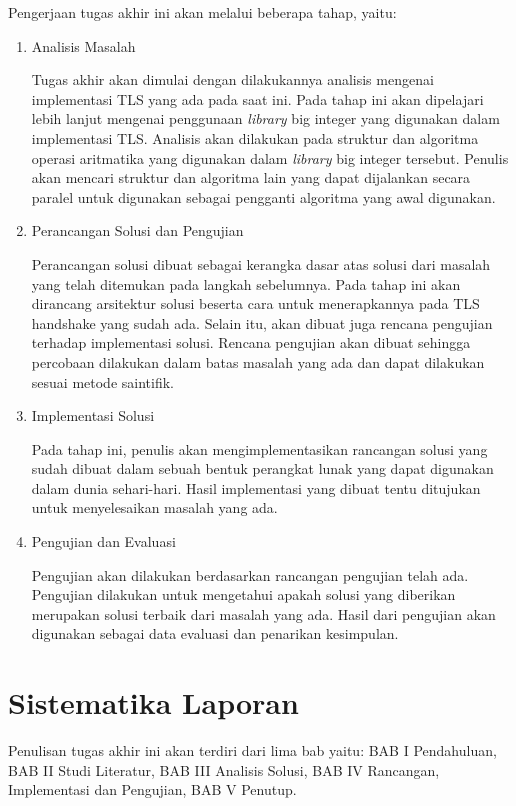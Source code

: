     Pengerjaan tugas akhir ini akan melalui beberapa tahap, yaitu:
    \begin{enumerate}
      \item Analisis Masalah

        Tugas akhir akan dimulai dengan dilakukannya analisis mengenai implementasi TLS yang ada pada saat ini. Pada tahap ini akan dipelajari lebih lanjut mengenai penggunaan \textit{library} big integer yang digunakan dalam implementasi TLS. Analisis akan dilakukan pada struktur dan algoritma operasi aritmatika yang digunakan dalam \textit{library} big integer tersebut. Penulis akan mencari struktur dan algoritma lain yang dapat dijalankan secara paralel untuk digunakan sebagai pengganti algoritma yang awal digunakan.

      \item Perancangan Solusi dan Pengujian

        Perancangan solusi dibuat sebagai kerangka dasar atas solusi dari masalah yang telah ditemukan pada langkah sebelumnya. Pada tahap ini akan dirancang arsitektur solusi beserta cara untuk menerapkannya pada TLS handshake yang sudah ada. Selain itu, akan dibuat juga rencana pengujian terhadap implementasi solusi. Rencana pengujian akan dibuat sehingga percobaan dilakukan dalam batas masalah yang ada dan dapat dilakukan sesuai metode saintifik.

      \item Implementasi Solusi

        Pada tahap ini, penulis akan mengimplementasikan rancangan solusi yang sudah dibuat dalam sebuah bentuk perangkat lunak yang dapat digunakan dalam dunia sehari-hari. Hasil implementasi yang dibuat tentu ditujukan untuk menyelesaikan masalah yang ada.

      \item Pengujian dan Evaluasi

        Pengujian akan dilakukan berdasarkan rancangan pengujian telah ada. Pengujian dilakukan untuk mengetahui apakah solusi yang diberikan merupakan solusi terbaik dari masalah yang ada. Hasil dari pengujian akan digunakan sebagai data evaluasi dan penarikan kesimpulan.

    \end{enumerate}


  \section{Sistematika Laporan}
    Penulisan tugas akhir ini akan terdiri dari lima bab yaitu: BAB I Pendahuluan, BAB II Studi Literatur, BAB III Analisis Solusi, BAB IV Rancangan, Implementasi dan Pengujian, BAB V Penutup.

